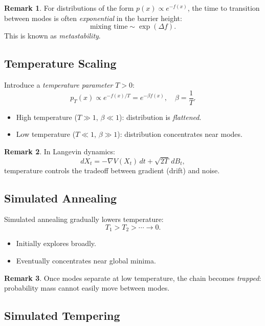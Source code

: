 \documentclass[12pt,oneside]{book}
\numberwithin{equation}{section}
\theoremstyle{definition}
\newtheorem{remark}{Remark}[section]
\theoremstyle{plain}
\theoremstyle{remark}
\begin{document}
\begin{remark}
For distributions of the form $p(x) \propto e^{-f(x)}$, the time to transition between modes is often \emph{exponential} in the barrier height:
\[
\text{mixing time} \sim \exp(\Delta f).
\]
This is known as \emph{metastability}.
\end{remark}

\subsection{Temperature Scaling}

Introduce a \emph{temperature parameter} $T > 0$:
\[
p_T(x) \propto e^{-f(x)/T} = e^{-\beta f(x)}, \quad \beta = \frac{1}{T}.
\]

\begin{itemize}
    \item High temperature ($T \gg 1$, $\beta \ll 1$): distribution is \emph{flattened}.
    \item Low temperature ($T \ll 1$, $\beta \gg 1$): distribution concentrates near modes.
\end{itemize}

\begin{remark}
In Langevin dynamics:
\[
dX_t = -\nabla V(X_t)\,dt + \sqrt{2T}\,dB_t,
\]
temperature controls the tradeoff between gradient (drift) and noise.
\end{remark}

\subsection{Simulated Annealing}

Simulated annealing gradually lowers temperature:
\[
T_1 > T_2 > \cdots \to 0.
\]

\begin{itemize}
    \item Initially explores broadly.
    \item Eventually concentrates near global minima.
\end{itemize}

\begin{remark}
Once modes separate at low temperature, the chain becomes \emph{trapped}:
probability mass cannot easily move between modes.
\end{remark}

\subsection{Simulated Tempering}
\end{document}
